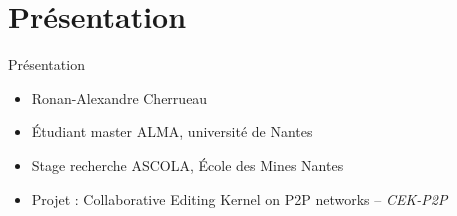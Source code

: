 \section{Pr\'esentation}
\begin{frame}{Pr\'esentation}
\begin{itemize}
  \item Ronan-Alexandre Cherrueau
  \item Étudiant master ALMA, université de Nantes
  \item Stage recherche ASCOLA, École des Mines Nantes
  \item Projet : Collaborative Editing Kernel on P2P networks -- \emph{CEK-P2P}
\end{itemize}
\end{frame}

